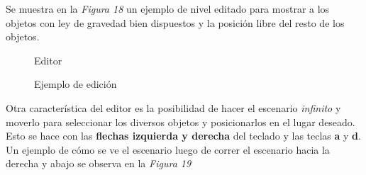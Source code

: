 \documentclass[a4paper]{article}
\begin{document}
Se muestra en la \textit{Figura 18} un ejemplo de nivel editado para mostrar a los objetos con ley de gravedad bien dispuestos y la posición libre del resto de los objetos.

\begin{figure}[!h]
	\caption{Editor}
	\label{fig:diagrama18}
\end{figure}

\begin{figure}[!h]
	\caption{Ejemplo de edición}
	\label{fig:diagrama19}
\end{figure}

\newpage

Otra característica del editor es la posibilidad de hacer el escenario \textit{infinito} y moverlo para seleccionar los diversos objetos y posicionarlos en el lugar deseado. Esto se hace con las \textbf{flechas izquierda y derecha} del teclado y las teclas \textbf{a} y \textbf{d}. Un ejemplo de cómo se ve el escenario luego de correr el escenario hacia la derecha y abajo se observa en la \textit{Figura 19}
\end{document}
